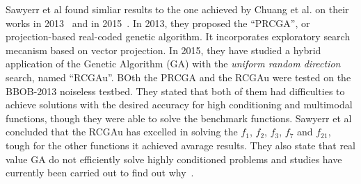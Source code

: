 Sawyerr et al found simliar results to the one achieved by Chuang et al. on their works in 2013~\cite{sawyerr2013benchmarking} and in 2015~\cite{sawyerr2015benchmarking}. In 2013, they proposed the ``PRCGA'', or projection-based real-coded genetic algorithm. It incorporates exploratory search mecanism based on vector projection. In 2015, they have studied a hybrid application of the Genetic Algorithm (GA) with the \textit{uniform random direction} search, named ``RCGAu''. BOth the PRCGA and the RCGAu were tested on the BBOB-2013 noiseless testbed. They stated that both of them had difficulties to achieve solutions with the desired accuracy for high conditioning and multimodal functions, though they were able to solve the benchmark functions.  Sawyerr et al concluded that the RCGAu has excelled in solving the $f_1$, $f_2$, $f_3$, $f_7$ and $f_{21}$, tough for the other functions it achieved avarage results. They also state that real value GA do not efficiently solve highly conditioned problems and studies have currently been carried out to find out why~\cite{sawyerr2015benchmarking}.
